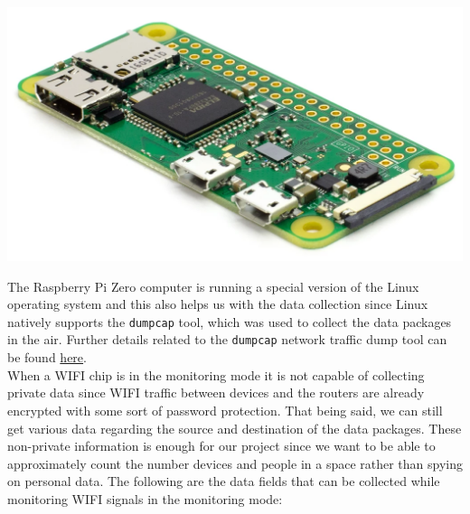 \documentclass[journal, 12pt]{IEEEtran}
\begin{document}
\begingroup
    \center
    \medskip
    \includegraphics[width=0.6\columnwidth]{report/interim_report/images/raspi.png}
    \label{fig:raspi}
    \medskip
\endgroup

\noindent The  Raspberry Pi Zero computer is running a special version of the Linux operating system and this also helps us with the data collection since Linux natively supports the \texttt{dumpcap} tool, which was used to collect the data packages in the air. Further details related to the \texttt{dumpcap} network traffic dump tool can be found  \href{https://linux.die.net/man/1/dumpcap}{here}.\\

\noindent When a WIFI chip is in the monitoring mode it is not capable of collecting private data since WIFI traffic between devices and the routers are already encrypted with some sort of password protection. That being said, we can still get various data regarding the source and destination of the data packages. These non-private information is enough for our project since we want to be able to approximately count the number devices and people in a space rather than spying on personal data. The following are the data fields that can be collected while monitoring WIFI signals in the monitoring mode:
\end{document}
